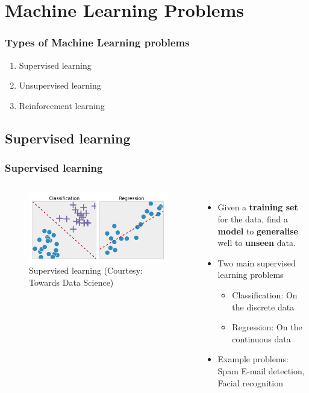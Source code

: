 \documentclass[aspectratio=169]{beamer}
\begin{document}
\section{Machine Learning Problems}

\begin{frame}
	\frametitle{Types of Machine Learning problems}
	\begin{enumerate}
		\item<2-> Supervised learning
		\item<3-> Unsupervised learning
		\item<4-> Reinforcement learning
	\end{enumerate}
\end{frame}

\subsection{Supervised learning}

\begin{frame}
	\frametitle{Supervised learning}
	\begin{columns}
		\begin{figure}
			\includegraphics[width=1.0\textwidth]{imgs/supervised_learning.png}
			\caption{Supervised learning (Courtesy: Towards Data Science)}
		\end{figure}
		\begin{itemize}
			\item<2-> Given a \textbf{training set} for the data, find a \textbf{model} to \textbf{generalise} well to \textbf{unseen} data.
			\item<3-> Two main supervised learning problems
			      \begin{itemize}
				      \item<4-> Classification: On the discrete data
				      \item<5-> Regression: On the continuous data
			      \end{itemize}
			\item<6-> Example problems: Spam E-mail detection, Facial recognition
		\end{itemize}
	\end{columns}
\end{frame}
\end{document}
